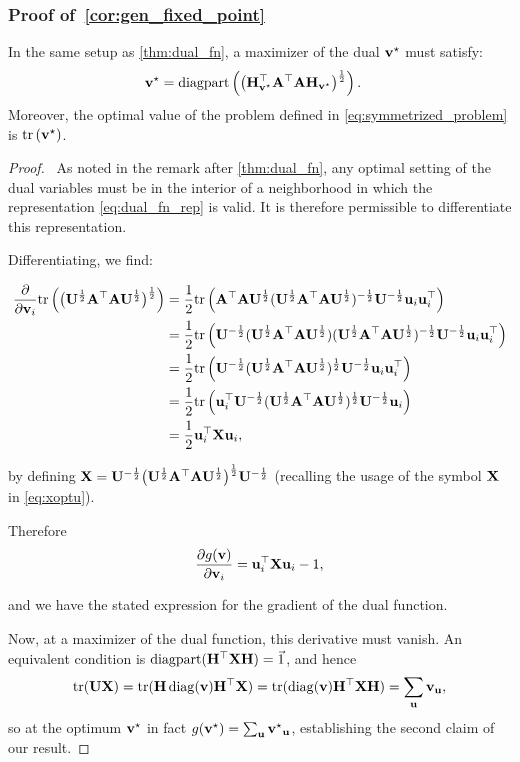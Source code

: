 \subsubsection{Proof of~\cref{cor:gen_fixed_point}}
\begin{namedcorollary}
In the same setup as \cref{thm:dual_fn}, a maximizer of the dual ${\mathbf{v}^\star}$ must satisfy:
\begin{align}
{\ensuremath{\mathbf{v}}^\star} 
  &= \operatorname{diagpart}\left(\big(\mathbf{H}_{{\mathbf{v}^\star}}^\top \mathbf{A}^\top\mathbf{A} \mathbf{H}_{{\mathbf{v}^\star}}\big)^\frac{1}{2}\right).
\end{align}
Moreover, the optimal value of the problem defined in \ref{eq:symmetrized_problem} is $\mathrm{tr}\left({\mathbf{v}^\star}\right)$.
\end{namedcorollary}
\begin{proof}
\
As noted in the remark after \cref{thm:dual_fn}, any optimal setting of the dual variables must be in the interior of a neighborhood in which the representation \cref{eq:dual_fn_rep} is valid. It is therefore permissible to differentiate this representation.


Differentiating, we find:

\begin{align*}
 \frac{\partial}{\partial \mathbf{v}_i} \mathrm{tr} \left( \big(\mathbf{U}^\frac{1}{2} \mathbf{A}^\top\mathbf{A} \mathbf{U}^\frac{1}{2} \big)^\frac{1}{2} \right)
 &=  \frac{1}{2} \mathrm{tr}\left( \mathbf{A}^\top\mathbf{A} \mathbf{U}^\frac{1}{2} (\mathbf{U}^\frac{1}{2} \mathbf{A}^\top\mathbf{A} \mathbf{U}^\frac{1}{2})^{-\frac{1}{2}} \mathbf{U}^{-\frac{1}{2}} \mathbf{u}_i \mathbf{u}_i^\top \right) \\
&= \frac{1}{2} \mathrm{tr}\left( \mathbf{U}^{-\frac{1}{2}} (\mathbf{U}^\frac{1}{2} \mathbf{A}^\top\mathbf{A} \mathbf{U}^\frac{1}{2}) (\mathbf{U}^\frac{1}{2} \mathbf{A}^\top\mathbf{A} \mathbf{U}^\frac{1}{2})^{-\frac{1}{2}} \mathbf{U}^{-\frac{1}{2}} \mathbf{u}_i \mathbf{u}_i^\top \right) \\
&= \frac{1}{2} \mathrm{tr}\left( \mathbf{U}^{-\frac{1}{2}} (\mathbf{U}^\frac{1}{2} \mathbf{A}^\top\mathbf{A} \mathbf{U}^\frac{1}{2})^\frac{1}{2} \mathbf{U}^{-\frac{1}{2}} \mathbf{u}_i \mathbf{u}_i^\top \right) \\
&= \frac{1}{2} \mathrm{tr}\left(\mathbf{u}_i^\top \mathbf{U}^{-\frac{1}{2}} (\mathbf{U}^\frac{1}{2} \mathbf{A}^\top\mathbf{A} \mathbf{U}^\frac{1}{2})^\frac{1}{2} \mathbf{U}^{-\frac{1}{2}} \mathbf{u}_i \right)\\
&= \frac{1}{2}\mathbf{u}_i^\top \mathbf{X} \mathbf{u}_i,  \\
\end{align*}

by defining $\mathbf{X} = \mathbf{U}^{-\frac{1}{2}} \big(\mathbf{U}^\frac{1}{2} \mathbf{A}^\top\mathbf{A} \mathbf{U}^\frac{1}{2} \big)^\frac{1}{2} \mathbf{U}^{-\frac{1}{2}}$ (recalling the usage of the symbol $\mathbf{X}$ in \cref{eq:xoptu}).

Therefore
\[
 \frac{\partial g(\mathbf{v})}{\partial \mathbf{v}_i} =  \mathbf{u}_i^\top \mathbf{X} \mathbf{u}_i - 1,
\]

and we have the stated expression for the gradient of the dual function.

Now, at a maximizer of the dual function, this derivative must vanish.  An equivalent condition is $\operatorname{diagpart}(\mathbf{H}^\top \mathbf{X} \mathbf{H}) = \vec{1}$, and hence 
\begin{equation}
\mathrm{tr}(\mathbf{U} \mathbf{X})
= \mathrm{tr}(\mathbf{H} \operatorname{diag}(\mathbf{v}) \mathbf{H}^\top \mathbf{X} ) 
= \mathrm{tr}(\operatorname{diag}(\mathbf{v}) \mathbf{H}^\top \mathbf{X} \mathbf{H}) = \sum_{\mathbf{u}} \mathbf{v}_{\mathbf{u}},
\end{equation}
so at the optimum ${\mathbf{v}^\star}$ in fact $g({\mathbf{v}^\star}) = \sum_{\mathbf{u}} {\mathbf{v}^\star}_{\mathbf{u}}$, establishing the second claim of our result.



\end{proof}
